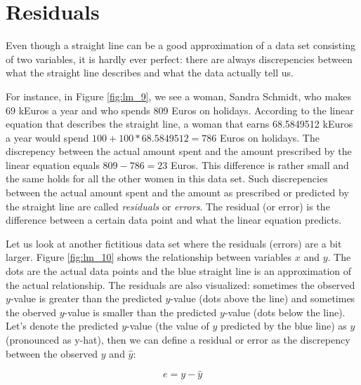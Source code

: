 \documentclass[]{book}\usepackage[]{graphicx}\usepackage[]{color}
\begin{document}
\section{Residuals}

Even though a straight line can be a good approximation of a data set consisting of two variables, it is hardly ever perfect: there are always discrepencies between what the straight line describes and what the data actually tell us.

For instance, in Figure \ref{fig:lm_9}, we see a woman, Sandra Schmidt, who makes 69 kEuros a year and who spends 809 Euros on holidays. According to the linear equation that describes the straight line, a woman that earns 68.5849512 kEuros a year would spend $100 + 100 * 68.5849512= 786$ Euros on holidays. The discrepency between the actual amount spent and the amount prescribed by the linear equation equals $809-786=23$ Euros. This difference is rather small and the same holds for all the other women in this data set. Such discrepencies between the actual amount spent and the amount as prescribed or predicted by the straight line are called \textit{residuals} or \textit{errors}. The residual (or error) is the difference between a certain data point and what the linear equation predicts.




Let us look at another fictitious data set where the residuals (errors) are a bit larger. Figure \ref{fig:lm_10} shows the relationship between variables $x$ and $y$. The dots are the actual data points and the blue straight line is an approximation of the actual relationship. The residuals are also visualized: sometimes the observed $y$-value is greater than the predicted $y$-value (dots above the line) and sometimes the oberved $y$-value is smaller than the predicted $y$-value (dots below the line). Let's denote the predicted $y$-value (the value of $y$ predicted by the blue line) as $\hat{y}$ (pronounced as y-hat), then we can define a residual or error as the discrepency between the observed $y$ and $\hat{y}$:

\begin{equation}
e = y - \hat{y}
\end{equation}
\end{document}
